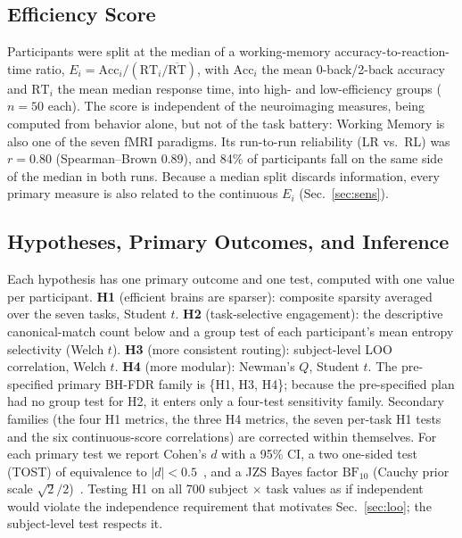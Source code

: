 \documentclass[conference]{IEEEtran}
\begin{document}
\subsection{Efficiency Score}

Participants were split at the median of a working-memory accuracy-to-reaction-time ratio, $E_i = \mathrm{Acc}_i / (\mathrm{RT}_i / \overline{\mathrm{RT}})$, with $\mathrm{Acc}_i$ the mean 0-back/2-back accuracy and $\mathrm{RT}_i$ the mean median response time, into high- and low-efficiency groups ($n = 50$ each). The score is independent of the neuroimaging measures, being computed from behavior alone, but not of the task battery: Working Memory is also one of the seven fMRI paradigms. Its run-to-run reliability (LR vs.\ RL) was $r = 0.80$ (Spearman--Brown $0.89$), and 84\% of participants fall on the same side of the median in both runs. Because a median split discards information, every primary measure is also related to the continuous $E_i$ (Sec.~\ref{sec:sens}).

\subsection{Hypotheses, Primary Outcomes, and Inference}

Each hypothesis has one primary outcome and one test, computed with one value per participant. \textbf{H1} (efficient brains are sparser): composite sparsity averaged over the seven tasks, Student $t$. \textbf{H2} (task-selective engagement): the descriptive canonical-match count below and a group test of each participant's mean entropy selectivity (Welch $t$). \textbf{H3} (more consistent routing): subject-level LOO correlation, Welch $t$. \textbf{H4} (more modular): Newman's $Q$, Student $t$. The pre-specified primary BH-FDR family is \{H1, H3, H4\}; because the pre-specified plan had no group test for H2, it enters only a four-test sensitivity family. Secondary families (the four H1 metrics, the three H4 metrics, the seven per-task H1 tests and the six continuous-score correlations) are corrected within themselves. For each primary test we report Cohen's $d$ with a 95\% CI, a two one-sided test (TOST) of equivalence to $|d| < 0.5$~\cite{lakens2017equivalence}, and a JZS Bayes factor $\mathrm{BF}_{10}$ (Cauchy prior scale $\sqrt{2}/2$)~\cite{rouder2009bayesian}. Testing H1 on all 700 subject $\times$ task values as if independent would violate the independence requirement that motivates Sec.~\ref{sec:loo}; the subject-level test respects it.
\end{document}
